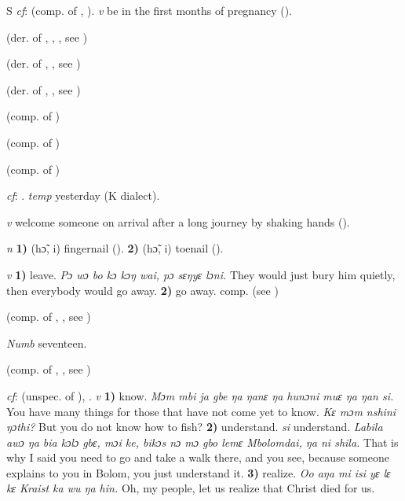 \begin{letter}{S}
 \textit{cf}:  (comp. of , ). \textit{v} be in the first months of pregnancy (\citealt{Pichl1967}).

 (der. of , , , see ) 

 (der. of , , see ) 

 (der. of , , see ) 

 (comp. of )

 (comp. of )

 (comp. of ) 

 \textit{cf}: . \textit{temp} yesterday (K dialect).

 \textit{v} welcome someone on arrival after a long journey by shaking hands (\citealt{Pichl1967}).

 \textit{n} \textbf{1)} (hɔ̃, i) fingernail (\citealt{Pichl1967}). \textbf{2)} (hɔ̃, i) toenail (\citealt{Pichl1967}).

 \textit{v} \textbf{1)} leave. \textit{Pɔ wɔ bo kɔ kɔŋ wai, pɔ sɛŋyɛ lɔni.} They would just bury him quietly, then everybody would go away. \textbf{2)} go away. comp.  (see ) 

 (comp. of , , see ) 

 \textit{Numb} seventeen.

 (comp. of , , see ) 

 \textit{cf}:  (unspec. of ), . \textit{v} \textbf{1)} know. \textit{Mɔm mbi ja gbe ŋa ŋanɛ ŋa hunɔni muɛ ŋa ŋan si.} You have many things for those that have not come yet to know. \textit{Kɛ mɔm nshini ŋɔthi?} But you do not know how to fish? \textbf{2)} understand. \textit{si} understand. \textit{Labila awɔ ŋa bia kɔlɔ gbɛ, mɔi ke, bikɔs nɔ mɔ gbo lemɛ Mbolomdai, ŋa ni shila.} That is why I said you need to go and take a walk there, and you see, because someone explains to you in Bolom, you just understand it. \textbf{3)} realize. \textit{Oo aŋa mi isi yɛ lɛ kɛ Kraist ka wu ŋa hin.} Oh, my people, let us realize that Christ died for us.


\end{letter}

